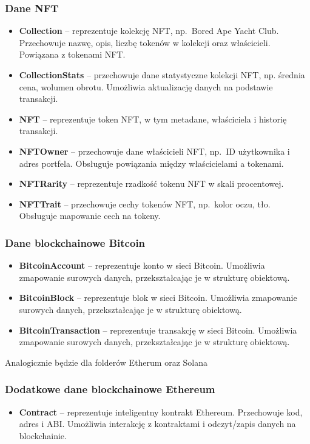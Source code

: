 \subsubsection{Dane NFT}
\begin{itemize}
\item \textbf{Collection} -- reprezentuje kolekcję NFT, np.\ Bored Ape Yacht Club. Przechowuje nazwę, opis, liczbę tokenów w kolekcji oraz właścicieli. Powiązana z tokenami NFT.
\item \textbf{CollectionStats} -- przechowuje dane statystyczne kolekcji NFT, np. średnia cena, wolumen obrotu. Umożliwia aktualizację danych na podstawie transakcji.
\item \textbf{NFT} -- reprezentuje token NFT, w tym metadane, właściciela i historię transakcji.
\item \textbf{NFTOwner} -- przechowuje dane właścicieli NFT, np.\ ID użytkownika i adres portfela. Obsługuje powiązania między właścicielami a tokenami.
\item \textbf{NFTRarity} -- reprezentuje rzadkość tokenu NFT w skali procentowej.
\item \textbf{NFTTrait} -- przechowuje cechy tokenów NFT, np.\ kolor oczu, tło. Obsługuje mapowanie cech na tokeny.
\end{itemize}

\subsubsection{Dane blockchainowe Bitcoin}
\begin{itemize}
\item \textbf{BitcoinAccount} -- reprezentuje konto w sieci Bitcoin. Umożliwia zmapowanie surowych danych, przekształcając je w strukturę obiektową.
\item \textbf{BitcoinBlock} -- reprezentuje blok w sieci Bitcoin. Umożliwia zmapowanie surowych danych, przekształcając je w strukturę obiektową.
\item \textbf{BitcoinTransaction} -- reprezentuje transakcję w sieci Bitcoin. Umożliwia zmapowanie surowych danych, przekształcając je w strukturę obiektową.
\end{itemize}

Analogicznie będzie dla folderów Etherum oraz Solana
\subsubsection{Dodatkowe dane blockchainowe Ethereum}
\begin{itemize}
\item \textbf{Contract} -- reprezentuje inteligentny kontrakt Ethereum. Przechowuje kod, adres i ABI. Umożliwia interakcję z kontraktami i odczyt/zapis danych na blockchainie.
\end{itemize}

